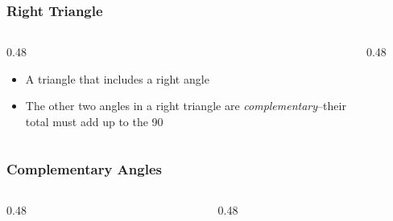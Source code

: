 \begin{frame}
	\frametitle{Right Triangle}

    \begin{columns}
        \begin{column}{0.48\linewidth}
            \begin{itemize}[<+- | alert@+>]
                \item A triangle that includes a right angle
                \item The other two angles in a right triangle are \emph{complementary}--their total must add up to the 90\textdegree{}
            \end{itemize}
        \end{column}
        \begin{column}{0.48\linewidth}
            \begin{figure}
                \centering
                \resizebox{0.75\linewidth}{!}{
                    
                }
            \end{figure}
        \end{column}
    \end{columns}
\end{frame}

\begin{frame}
	\frametitle{Complementary Angles}
    \begin{columns}
        \begin{column}{0.48\linewidth}
            \begin{figure}
                \centering
                \resizebox{0.75\linewidth}{!}{
                    
                }
            \end{figure}
        \end{column}
        \begin{column}{0.48\linewidth}
            \begin{figure}
                \centering
                \resizebox{0.75\linewidth}{!}{
                    
                }
            \end{figure}
        \end{column}
    \end{columns}
\end{frame}


